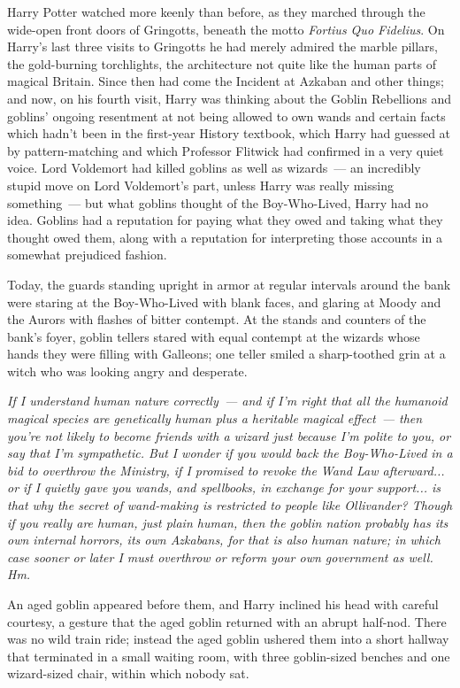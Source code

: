 Harry Potter watched more keenly than before, as they marched through the wide-open front doors of Gringotts, beneath the motto \emph{Fortius Quo Fidelius}. On Harry's last three visits to Gringotts he had merely admired the marble pillars, the gold-burning torchlights, the architecture not quite like the human parts of magical Britain. Since then had come the Incident at Azkaban and other things; and now, on his fourth visit, Harry was thinking about the Goblin Rebellions and goblins' ongoing resentment at not being allowed to own wands and certain facts which hadn't been in the first-year History textbook, which Harry had guessed at by pattern-matching and which Professor Flitwick had confirmed in a very quiet voice. Lord Voldemort had killed goblins as well as wizards~--- an incredibly stupid move on Lord Voldemort's part, unless Harry was really missing something~--- but what goblins thought of the Boy-Who-Lived, Harry had no idea. Goblins had a reputation for paying what they owed and taking what they thought owed them, along with a reputation for interpreting those accounts in a somewhat prejudiced fashion.

Today, the guards standing upright in armor at regular intervals around the bank were staring at the Boy-Who-Lived with blank faces, and glaring at Moody and the Aurors with flashes of bitter contempt. At the stands and counters of the bank's foyer, goblin tellers stared with equal contempt at the wizards whose hands they were filling with Galleons; one teller smiled a sharp-toothed grin at a witch who was looking angry and desperate.

\emph{If I understand human nature correctly~--- and if I'm right that all the humanoid magical species are genetically human plus a heritable magical effect~--- then you're not likely to become friends with a wizard just because I'm polite to you, or say that I'm sympathetic. But} \emph{I wonder if you would back the Boy-Who-Lived in a bid to overthrow the Ministry, if I promised to revoke the Wand Law afterward... or if I quietly gave you wands, and spellbooks, in exchange for your support... is that why the secret of wand-making is restricted to people like Ollivander? Though if you really are human, just plain human, then the goblin nation probably has its own internal horrors, its own Azkabans, for that is also human nature; in which case sooner or later I must overthrow or reform your own government as well. Hm.}

An aged goblin appeared before them, and Harry inclined his head with careful courtesy, a gesture that the aged goblin returned with an abrupt half-nod. There was no wild train ride; instead the aged goblin ushered them into a short hallway that terminated in a small waiting room, with three goblin-sized benches and one wizard-sized chair, within which nobody sat.

